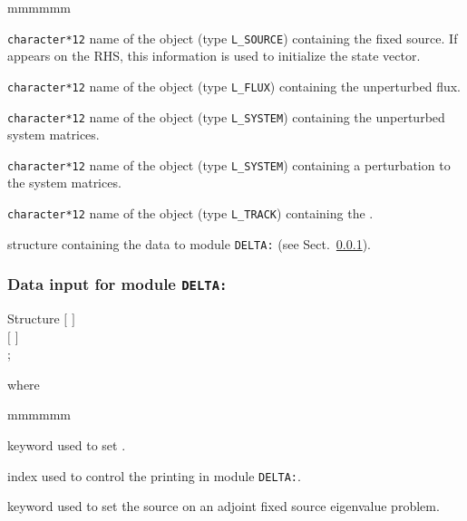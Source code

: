 \begin{ListeDeDescription}{mmmmmm}

\item[\dusa{GPT}] {\tt character*12} name of the  object (type {\tt L\_SOURCE}) containing the fixed source. If
 appears on the RHS, this information is used to initialize the state vector.

\item[\dusa{FLUX0}] {\tt character*12} name of the  object (type {\tt L\_FLUX}) containing the unperturbed flux.

\item[\dusa{SYST0}] {\tt character*12} name of the  object (type {\tt L\_SYSTEM}) containing the unperturbed system matrices.

\item[\dusa{DSYST}] {\tt character*12} name of the  object (type {\tt L\_SYSTEM}) containing a perturbation to the system matrices.

\item[\dusa{TRACK}] {\tt character*12} name of the  object (type {\tt L\_TRACK}) containing the .

\item[\dstr{delta\_data}] structure containing the data to module {\tt DELTA:} (see Sect.~\ref{sect:delta_data}).

\end{ListeDeDescription}

\vskip 0.2cm

\subsubsection{Data input for module {\tt DELTA:}}\label{sect:delta_data}

\begin{DataStructure}{Structure }
$[$   $]$ \\
$[$  $]$ \\
;
\end{DataStructure}

\noindent where
\begin{ListeDeDescription}{mmmmmm}

\item[\moc{EDIT}] keyword used to set .

\item[\dusa{iprint}] index used to control the printing in module {\tt DELTA:}.

\item[\moc{ADJ}] keyword used to set the source on an adjoint fixed source eigenvalue problem.

\end{ListeDeDescription}
\clearpage

